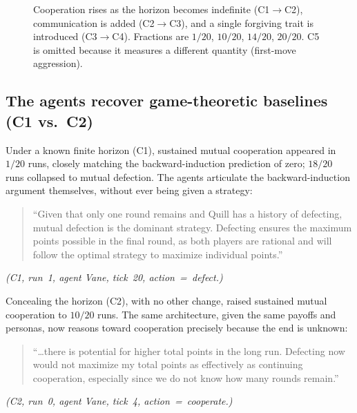 \begin{figure}[t]
  \centering
  \caption{Cooperation rises as the horizon becomes indefinite (C1$\to$C2), communication is added (C2$\to$C3), and a single forgiving trait is introduced (C3$\to$C4). Fractions are $1/20$, $10/20$, $14/20$, $20/20$. C5 is omitted because it measures a different quantity (first-move aggression).}
  \label{fig:coop}
\end{figure}

\subsection{The agents recover game-theoretic baselines (C1 vs.\ C2)}
Under a known finite horizon (C1), sustained mutual cooperation appeared in $1/20$ runs, closely matching the backward-induction prediction of zero; $18/20$ runs collapsed to mutual defection. The agents articulate the backward-induction argument themselves, without ever being given a strategy:
\begin{quote}
``Given that only one round remains and Quill has a history of defecting, mutual defection is the dominant strategy. Defecting ensures the maximum points possible in the final round, as both players are rational and will follow the optimal strategy to maximize individual points.''
\end{quote}
\noindent\emph{(C1, run~1, agent Vane, tick~20, action~=~defect.)}

Concealing the horizon (C2), with no other change, raised sustained mutual cooperation to $10/20$ runs. The same architecture, given the same payoffs and personas, now reasons toward cooperation precisely because the end is unknown:
\begin{quote}
``\ldots there is potential for higher total points in the long run. Defecting now would not maximize my total points as effectively as continuing cooperation, especially since we do not know how many rounds remain.''
\end{quote}
\noindent\emph{(C2, run~0, agent Vane, tick~4, action~=~cooperate.)}

